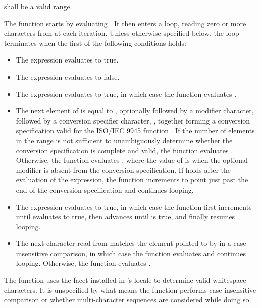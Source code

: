 \begin{itemdescr}
\pnum
\requires {} shall be a valid range.

\pnum
\effects The function starts by evaluating
. It then enters a loop, reading zero or more
characters from  at each iteration. Unless otherwise specified below,
the loop terminates when the first of the following conditions holds:

\begin{itemize}
\item The expression  evaluates to true.

\item The expression  evaluates to false.

\item The expression  evaluates to true,
in which case the function
evaluates .

\item The next element of  is equal to
, optionally followed by a
modifier character, followed by a conversion specifier character,
, together forming a conversion specification valid for the
ISO/IEC 9945 function . If the number of elements in the range
 is not sufficient to unambiguously determine whether the
conversion specification is complete and valid, the function evaluates
. Otherwise, the function evaluates
, where the value
of  is 
when the optional modifier is absent from the conversion specification.
If  holds after the evaluation of the
expression, the function increments  to point just past the end of
the conversion specification and continues looping.

\item The expression  evaluates to true,
in which case
the function first increments  until
 evaluates to true,
then advances  until
 is true, and finally resumes looping.

\item The next character read from  matches the element
pointed to by  in
a case-insensitive comparison, in which case the function evaluates
 and continues looping. Otherwise, the function evaluates
.
\end{itemize}

\pnum
\enternote The function uses the 
facet installed in 's locale
to determine valid whitespace characters. It is unspecified by what
means the function performs case-insensitive comparison or whether
multi-character sequences are considered while doing so.

\pnum
\returns {}
\end{itemdescr}

